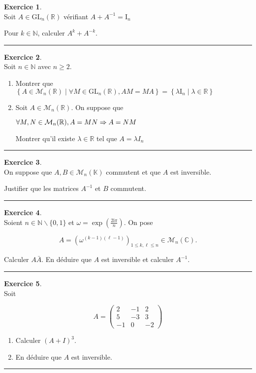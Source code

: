 \documentclass[a4paper,11pt]{article}
\theoremstyle{definition}
\newtheorem{exo}{Exercice} %
\begin{document}
\begin{exo}\textit{}\quad\\[0.25cm]
Soit $A \in \mathrm{GL}_{n}(\mathbb{R})$ vérifiant $A+A^{-1}=\mathrm{I}_{n}
$

Pour $k \in \mathbb{N}$, calculer $A^{k}+A^{-k}$.

	\centering
	\rule{1\linewidth}{0.6pt}
\end{exo}

\begin{exo}\textit{}\quad\\[0.25cm]
	Soit $n \in \mathbb{N}$ avec $n \geq 2$.
	\begin{enumerate}
		\item Montrer que \quad $\left\{A \in \mathcal{M}_{n}(\mathbb{R}) \mid \forall M \in \mathrm{GL}_{n}(\mathbb{R}), A M=M A\right\}=\left\{\lambda \mathrm{I}_{n} \mid \lambda \in \mathbb{R}\right\}
		$
		\item Soit $A \in \mathcal{M}_{n}(\mathbb{R})$. On suppose que
		
		$
		\forall M, N \in \mathcal{M}_{n}(\mathbb{R}), A=M N \Large\Rightarrow A=N M
		$
		
		Montrer qu'il existe $\lambda \in \mathbb{R}$ tel que $A=\lambda I_{n}$
	\end{enumerate}

	
	\centering
	\rule{1\linewidth}{0.6pt}
\end{exo}

\begin{exo}\textit{}\quad\\[0.25cm]
	On suppose que $A, B \in \mathcal{M}_{n}(\mathbb{K})$ commutent et que $A$ est inversible.
	
	Justifier que les matrices $A^{-1}$ et $B$ commutent.
	
	\centering
	\rule{1\linewidth}{0.6pt}
\end{exo}

\newpage

\begin{exo}\textit{}\quad\\[0.25cm]
Soient $n \in \mathbb{N} \backslash\{0,1\}$ et $\omega=\exp \left(\frac{2 \mathrm{i} \pi}{n}\right)$. On pose

$$
A=\left(\omega^{(k-1)(\ell-1)}\right)_{1 \leq k, \ell \leq n} \in \mathcal{M}_{n}(\mathbb{C}) .
$$

Calculer $A \bar{A}$. En déduire que $A$ est inversible et calculer $A^{-1}$.
	
	\centering
	\rule{1\linewidth}{0.6pt}
\end{exo}


\begin{exo}\textit{}\quad\\[0.25cm]
Soit

$$
A=\left(\begin{array}{ccc}
2 & -1 & 2 \\
5 & -3 & 3 \\
-1 & 0 & -2
\end{array}\right)
$$
\begin{enumerate}
	
\item Calculer $(A+I)^{3}$.

\item  En déduire que $A$ est inversible.
\end{enumerate}	
\centering
\rule{1\linewidth}{0.6pt}
\end{exo}
		
\end{document}
